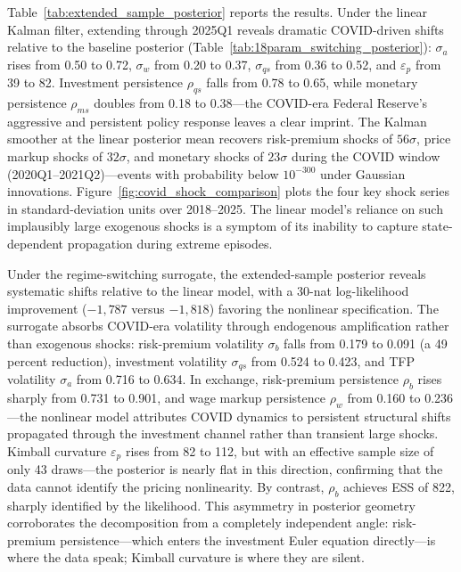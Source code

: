 \documentclass[12pt]{article}
\theoremstyle{plain}
\theoremstyle{definition}
\theoremstyle{remark}
\begin{document}
Table~\ref{tab:extended_sample_posterior} reports the results. Under the linear Kalman filter, extending through 2025Q1 reveals dramatic COVID-driven shifts relative to the baseline posterior (Table~\ref{tab:18param_switching_posterior}): $\sigma_a$ rises from 0.50 to 0.72, $\sigma_w$ from 0.20 to 0.37, $\sigma_{qs}$ from 0.36 to 0.52, and $\varepsilon_p$ from 39 to 82. Investment persistence $\rho_{qs}$ falls from 0.78 to 0.65, while monetary persistence $\rho_{ms}$ doubles from 0.18 to 0.38---the COVID-era Federal Reserve's aggressive and persistent policy response leaves a clear imprint. The Kalman smoother at the linear posterior mean recovers risk-premium shocks of $56\sigma$, price markup shocks of $32\sigma$, and monetary shocks of $23\sigma$ during the COVID window (2020Q1--2021Q2)---events with probability below $10^{-300}$ under Gaussian innovations. Figure~\ref{fig:covid_shock_comparison} plots the four key shock series in standard-deviation units over 2018--2025. The linear model's reliance on such implausibly large exogenous shocks is a symptom of its inability to capture state-dependent propagation during extreme episodes.

Under the regime-switching surrogate, the extended-sample posterior reveals systematic shifts relative to the linear model, with a 30-nat log-likelihood improvement ($-1{,}787$ versus $-1{,}818$) favoring the nonlinear specification. The surrogate absorbs COVID-era volatility through endogenous amplification rather than exogenous shocks: risk-premium volatility $\sigma_b$ falls from 0.179 to 0.091 (a 49 percent reduction), investment volatility $\sigma_{qs}$ from 0.524 to 0.423, and TFP volatility $\sigma_a$ from 0.716 to 0.634. In exchange, risk-premium persistence $\rho_b$ rises sharply from 0.731 to 0.901, and wage markup persistence $\rho_w$ from 0.160 to 0.236---the nonlinear model attributes COVID dynamics to persistent structural shifts propagated through the investment channel rather than transient large shocks. Kimball curvature $\varepsilon_p$ rises from 82 to 112, but with an effective sample size of only 43 draws---the posterior is nearly flat in this direction, confirming that the data cannot identify the pricing nonlinearity. By contrast, $\rho_b$ achieves ESS of 822, sharply identified by the likelihood. This asymmetry in posterior geometry corroborates the decomposition from a completely independent angle: risk-premium persistence---which enters the investment Euler equation directly---is where the data speak; Kimball curvature is where they are silent.
\end{document}
